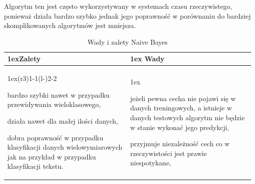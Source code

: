 Algorytm ten jest często wykorzystywany w systemach czasu rzeczywistego, ponieważ działa bardzo szybko jednak
jego poprawność w porównaniu do bardziej skomplikowanych algorytmów jest mniejsza.
\begin{table}[h]
    \begin{tabularx}{\linewidth}{>{\parskip1ex}X@{\kern4\tabcolsep}>{\parskip1ex}X}
    \toprule
    \hfil\bfseries Zalety
    &
    \hfil\bfseries Wady
    \\\cmidrule(r{3\tabcolsep}){1-1}\cmidrule(l{-\tabcolsep}){2-2}
    
    bardzo szybki nawet w przypadku przewidywania wieloklasowego,\par
    działa nawet dla małej ilości danych,\par
    dobra poprawność w przypadku klasyfikacji danych wielowymiarowych
    jak na przykład w przypadku klasyfikacji tekstu.\par
    
    &
    
    jeżeli pewna cecha nie pojawi się w danych treningowych, a istnieje w danych 
    testowych algorytm nie będzie w stanie wykonać jego predykcji,\par
    przyjmuje niezależność cech co w rzeczywistości jest prawie niespotykane,\par
    
    \\\bottomrule
    \end{tabularx}
    \caption{Wady i zalety Naive Bayes}
\end{table}

